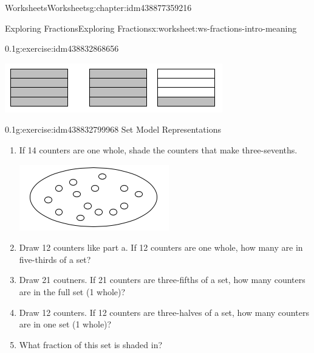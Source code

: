 \documentclass[twoside,11pt,]{book}
\begin{document}
\begin{chapterptx}{Worksheets}{}{Worksheets}{}{}{g:chapter:idm438877359216}
\begin{worksheet-section-numberless}{Exploring Fractions}{}{Exploring Fractions}{}{}{x:worksheet:ws-fractions-intro-meaning}
\begin{divisionexercise}{1}{}{0.1}{g:exercise:idm438832868656}
\begin{enumerate}[label=(\alph*)]
\begin{sidebyside}{1}{0.25}{0.25}{0}
\begin{sbspanel}{0.5}
\includegraphics[width=1\linewidth]{images/nine-fourths-vs-twelfths.png}
\end{sbspanel}%
\end{sidebyside}%
%
\end{enumerate}
\end{divisionexercise}%
\begin{divisionexercise}{2}{}{0.1}{g:exercise:idm438832799968}%
Set Model Representations%
\leavevmode%
\begin{enumerate}[label=(\alph*)]
\item{}If 14 counters are one whole, shade the counters that make three-sevenths. \leavevmode%
\begin{sidebyside}{1}{0.35}{0.35}{0}%
\begin{sbspanel}{0.3}%
\includegraphics[width=1\linewidth]{images/fourteen-counters.png}
\end{sbspanel}%
\end{sidebyside}%
%
\item{}Draw 12 counters like part a. If 12 counters are one whole, how many are in five-thirds of a set?%
\item{}Draw 21 coutners. If 21 counters are three-fifths of a set, how many counters are in the full set (1 whole)?%
\item{}Draw 12 counters. If 12 counters are three-halves of a set, how many counters are in one set (1 whole)?%
\item{}What fraction of this set is shaded in? \leavevmode%
\begin{sidebyside}{1}{0.35}{0.35}{0}%
\begin{sbspanel}{0.3}%

\end{sbspanel}
\end{sidebyside}
\end{enumerate}
\end{divisionexercise}
\end{worksheet-section-numberless}
\end{chapterptx}
\end{document}
